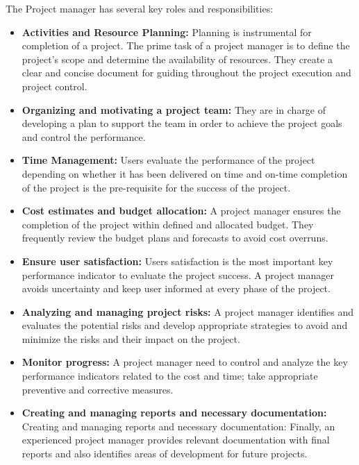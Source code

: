 The Project manager has several key roles and responsibilities:

\begin{itemize}
    \item \textbf{Activities and Resource Planning:}  Planning is instrumental for completion of a project. The prime task of a project manager is to define the project's scope and determine the availability of resources. They create a clear and concise document for guiding throughout the project execution and project control.

\item \textbf{Organizing and motivating a project team:} They are in charge of developing a plan to support the team in order to achieve the project goals and control the performance.

\item \textbf{Time Management:} Users evaluate the performance of the project depending on whether it has been delivered on time and on-time completion of the project is the pre-requisite for the success of the project.

\item \textbf{Cost estimates and budget allocation:}  A project manager ensures the completion of the project within defined and allocated budget. They frequently review the budget plans and forecasts to avoid cost overruns.

\item \textbf{Ensure user satisfaction:} Users satisfaction is the most important key performance indicator to evaluate the project success. A project manager avoids uncertainty and keep user informed at every phase of the project.

\item \textbf{Analyzing and managing project risks:} A project manager identifies and evaluates the potential risks and develop appropriate strategies to avoid and minimize the risks and their impact on the project. 

\item \textbf{Monitor progress:} A project manager need to control and analyze the key performance indicators related to the cost and time; take appropriate preventive and corrective measures. 

\item \textbf{Creating and managing reports and necessary documentation:} Creating and managing reports and necessary documentation: Finally, an experienced project manager provides relevant documentation with final reports and also identifies areas of development for future projects.
\end{itemize}

